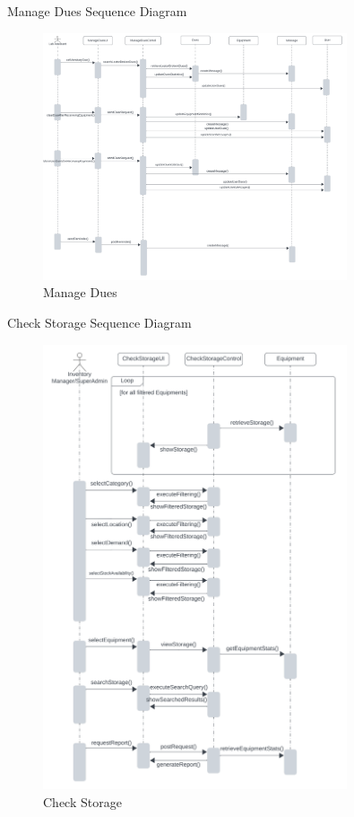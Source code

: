 \documentclass[20pt]{beamer}
\numberwithin{figure}{section}
\begin{document}
\begin{frame}{Manage Dues Sequence Diagram}

     \begin{figure}
        \centering
        \includegraphics[width= 0.8\textwidth , height= 0.8\paperheight]{ManageDuesSeq.png}
        \caption{Manage Dues}
        \label{fig:35}
    \end{figure}

\end{frame}

\begin{frame}{Check Storage Sequence Diagram}

     \begin{figure}
        \centering
        \includegraphics[width= 0.8\textwidth , height= 0.6\paperheight]{CheckStorageSeq.png}
        \caption{Check Storage}
        \label{fig:36}
    \end{figure}

\end{frame}
\end{document}
